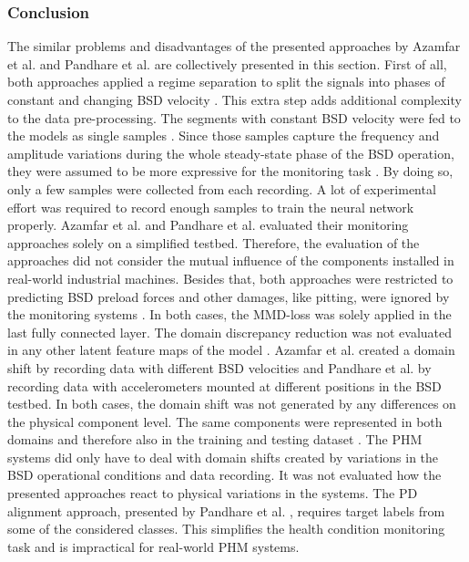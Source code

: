 \subsubsection{Conclusion}
The similar problems and disadvantages of the presented approaches by Azamfar et al. \cite{AZAMFAR2020103932} and Pandhare et al. \cite{Pandhare2021} are collectively presented in this section. First of all, both approaches applied a regime separation to split the signals into phases of constant and changing BSD velocity \cite{Pandhare2021} \cite{AZAMFAR2020103932} . This extra step adds additional complexity to the data pre-processing. The segments with constant BSD velocity were fed to the models as single samples \cite{Pandhare2021} \cite{AZAMFAR2020103932}. Since those samples capture the frequency and amplitude variations during the whole steady-state phase of the BSD operation, they were assumed to be more expressive for the monitoring task \cite{AZAMFAR2020103932}. By doing so, only a few samples were collected from each recording. A lot of experimental effort was required to record enough samples to train the neural network properly. Azamfar et al. \cite{AZAMFAR2020103932} and Pandhare et al. \cite{Pandhare2021} evaluated their monitoring approaches solely on a simplified testbed. Therefore, the evaluation of the approaches did not consider the mutual influence of the components installed in real-world industrial machines. Besides that, both approaches were restricted to predicting BSD preload forces and other damages, like pitting, were ignored by the monitoring systems \cite{Pandhare2021} \cite{AZAMFAR2020103932}. In both cases, the MMD-loss was solely applied in the last fully connected layer. The domain discrepancy reduction was not evaluated in any other latent feature maps of the model \cite{Pandhare2021} \cite{AZAMFAR2020103932}. Azamfar et al. \cite{AZAMFAR2020103932} created a domain shift by recording data with different BSD velocities and Pandhare et al. \cite{Pandhare2021} by recording data with accelerometers mounted at different positions in the BSD testbed. In both cases, the domain shift was not generated by any differences on the physical component level. The same components were represented in both domains and therefore also in the training and testing dataset \cite{Pandhare2021} \cite{AZAMFAR2020103932}. The PHM systems did only have to deal with domain shifts created by variations in the BSD operational conditions and data recording. It was not evaluated how the presented approaches react to physical variations in the systems. The PD alignment approach, presented by Pandhare et al. \cite{Pandhare2021}, requires target labels from some of the considered classes. This simplifies the health condition monitoring task and is impractical for real-world PHM systems.


